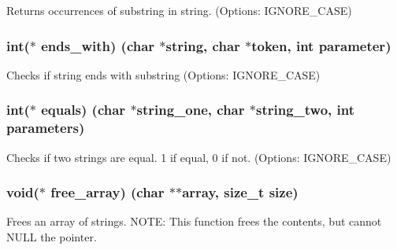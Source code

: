 Returns occurrences of substring in string. (Options\+: I\+G\+N\+O\+R\+E\+\_\+\+C\+A\+S\+E) 

\hypertarget{struct_string___utils_acb04b0d3ebef7b0bbf2a1dd85c21c1f5}{}
\subsubsection[{ends\+\_\+with}]{\setlength{\rightskip}{0pt plus 5cm}int($\ast$ ends\+\_\+with) (char $\ast$string, char $\ast$token, int parameter)}\label{struct_string___utils_acb04b0d3ebef7b0bbf2a1dd85c21c1f5}


Checks if string ends with substring (Options\+: I\+G\+N\+O\+R\+E\+\_\+\+C\+A\+S\+E) 

\hypertarget{struct_string___utils_ad3251d14f6d70d7b8a14a2f2e693fabe}{}
\subsubsection[{equals}]{\setlength{\rightskip}{0pt plus 5cm}int($\ast$ equals) (char $\ast$string\+\_\+one, char $\ast$string\+\_\+two, int parameters)}\label{struct_string___utils_ad3251d14f6d70d7b8a14a2f2e693fabe}


Checks if two strings are equal. 1 if equal, 0 if not. (Options\+: I\+G\+N\+O\+R\+E\+\_\+\+C\+A\+S\+E) 

\hypertarget{struct_string___utils_a7c06608656a34556a5780d7516979bf7}{}
\subsubsection[{free\+\_\+array}]{\setlength{\rightskip}{0pt plus 5cm}void($\ast$ free\+\_\+array) (char $\ast$$\ast$array, size\+\_\+t size)}\label{struct_string___utils_a7c06608656a34556a5780d7516979bf7}


Frees an array of strings. N\+O\+T\+E\+: This function frees the contents, but cannot N\+U\+L\+L the pointer. 

\hypertarget{struct_string___utils_a65e07feab3b61c0bb51c9b15dcb00c22}{}
